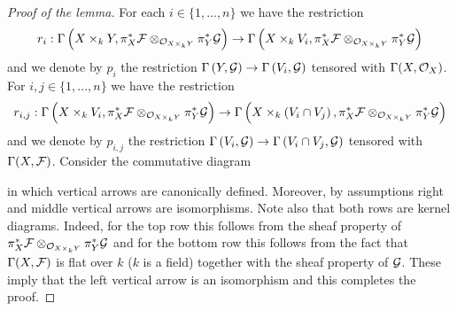 \begin{proof}[Proof of the lemma]
For each $i\in \{1,...,n\}$ we have the restriction
$$r_i:\Gamma\left(X \times_kY, \pi^*_X{\mathcal F}\otimes_{{\mathcal O}_{X \times_kY}} \pi^*_Y{\mathcal G} \right) \rightarrow \Gamma\left(X\times_kV_i, \pi^*_X{\mathcal F}\otimes_{{\mathcal O}_{X \times_kY}} \pi^*_Y{\mathcal G} \right)$$
and we denote by $p_i$ the restriction $\Gamma\left( Y,{\mathcal G} \right) \rightarrow \Gamma\left(V_i,{\mathcal G} \right)$ tensored with $\Gamma(X,{\mathcal O}_X)$. For $i, j \in \{1,...,n\}$ we have the restriction
$$r_{i,j}:\Gamma\left(X \times_kV_i,\pi^*_X{\mathcal F}\otimes_{{\mathcal O}_{X \times_kY}} \pi^*_Y{\mathcal G}\right)\rightarrow \Gamma\left(X\times_k\left(V_i\cap V_j\right),\pi^*_X{\mathcal F}\otimes_{{\mathcal O}_{X \times_kY}} \pi^*_Y{\mathcal G}\right)$$
and we denote by $p_{i,j}$ the restriction $\Gamma\left(V_i,{\mathcal G}\right)\rightarrow \Gamma\left(V_i\cap V_j ,{\mathcal G}\right)$ tensored with $\Gamma(X,{\mathcal F})$. Consider the commutative diagram
\begin{center}
\hspace*{-2.8cm}
\end{center}
in which vertical arrows are canonically defined. Moreover, by assumptions right and middle vertical arrows are isomorphisms. Note also that both rows are kernel diagrams. Indeed, for the top row this follows from the sheaf property of $\pi^*_X{\mathcal F}\otimes_{{\mathcal O}_{X \times_kY}} \pi^*_Y{\mathcal G}$ and for the bottom row this follows from the fact that $\Gamma(X,{\mathcal F})$ is flat over $k$ ($k$ is a field) together with the sheaf property of ${\mathcal G}$. These imply that the left vertical arrow is an isomorphism and this completes the proof.
\end{proof}

